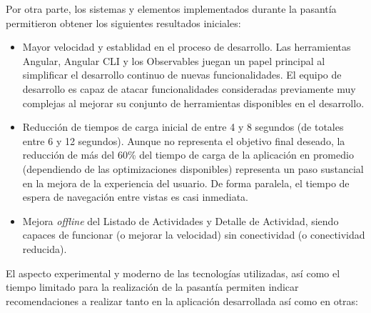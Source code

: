 Por otra parte, los sistemas y elementos implementados durante la pasantía permitieron obtener los siguientes resultados iniciales:

\begin{itemize}

  \item Mayor velocidad y establidad en el proceso de desarrollo. Las herramientas Angular, Angular CLI y los Observables juegan un papel principal al simplificar el desarrollo continuo de nuevas funcionalidades. El equipo de desarrollo es capaz de atacar funcionalidades consideradas previamente muy complejas al mejorar su conjunto de herramientas disponibles en el desarrollo.

  \item Reducción de tiempos de carga inicial de entre 4 y 8 segundos (de totales entre 6 y 12 segundos). Aunque no representa el objetivo final deseado, la reducción de más del 60\% del tiempo de carga de la aplicación en promedio (dependiendo de las optimizaciones disponibles) representa un paso sustancial en la mejora de la experiencia del usuario. De forma paralela, el tiempo de espera de navegación entre vistas es casi inmediata.

  \item Mejora \textit{offline} del Listado de Actividades y Detalle de Actividad, siendo capaces de funcionar (o mejorar la velocidad) sin conectividad (o conectividad reducida).

\end{itemize}

El aspecto experimental y moderno de las tecnologías utilizadas, así como el tiempo limitado para la realización de la pasantía permiten indicar recomendaciones a realizar tanto en la aplicación desarrollada así como en otras:

